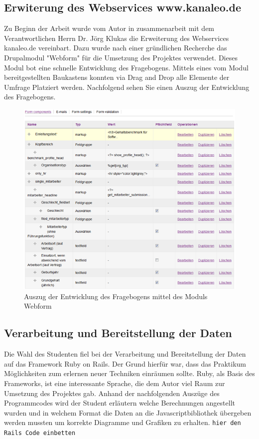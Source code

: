 \subsection{Erwiterung des Webservices www.kanaleo.de}
Zu Beginn der Arbeit wurde vom Autor in zusammenarbeit mit dem Verantwortlichen
Herrn Dr. Jörg Klukas die Erweiterung des Webservices kanaleo.de
vereinbart. Dazu wurde nach einer gründlichen Recherche das Drupalmodul
"Webform" für die Umsetzung des Projektes verwendet. Dieses Modul bot eine
schnelle Entwicklung des Fragebogens. Mittels eines vom Modul bereitgestellten
Baukastens konnten via Drag and Drop alle Elemente der Umfrage Platziert
werden. Nachfolgend sehen Sie einen Auszug der Entwicklung des
Fragebogens.\begin{figure}
 \centering
 \includegraphics{material/fragebogen.png}
 \caption{Auszug der Entwicklung des Fragebogens mittel des Moduls Webform}
\end{figure}
\newpage 
\subsection{Verarbeitung und Bereitstellung der Daten}
Die Wahl des Studenten fiel bei der Verarbeitung und Bereitstellung der Daten
auf das Framework Ruby on Rails. Der Grund hierfür war, dass das Praktikum
Möglichkeiten zum erlernen neuer Techniken einräumen sollte. Ruby, als Basis
des Frameworks, ist eine interessante Sprache, die dem Autor viel Raum zur
Umsetzung des Projektes gab. Anhand der nachfolgenden Auszüge des Programmcodes
wird der Student erläutern welche Berechnungen angestellt wurden und in welchem
Format die Daten an die Javascriptbibliothek übergeben werden mussten um
korrekte Diagramme und Grafiken zu erhalten. 
\verb|hier den Rails Code einbetten|
